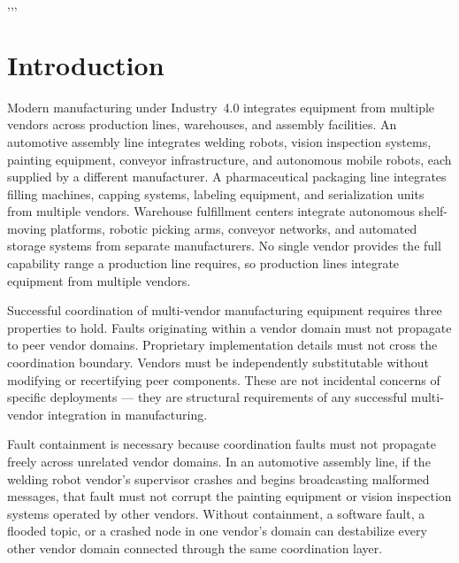 \documentclass[a4paper,fleqn]{cas-dc}
\begin{document}
\begin{highlights}
\item 
\item 
\item 
\end{highlights}



\begin{keywords}
 \sep \sep \sep
\end{keywords}

\maketitle

\section{Introduction} \label{sec:intro}

Modern manufacturing under Industry~4.0 integrates equipment from multiple vendors across production lines, warehouses, and assembly facilities. An automotive assembly line integrates welding robots, vision inspection systems, painting equipment, conveyor infrastructure, and autonomous mobile robots, each supplied by a different manufacturer. A pharmaceutical packaging line integrates filling machines, capping systems, labeling equipment, and serialization units from multiple vendors. Warehouse fulfillment centers integrate autonomous shelf-moving platforms, robotic picking arms, conveyor networks, and automated storage systems from separate manufacturers. No single vendor provides the full capability range a production line requires, so production lines integrate equipment from multiple vendors.

Successful coordination of multi-vendor manufacturing equipment requires three properties to hold. Faults originating within a vendor domain must not propagate to peer vendor domains. Proprietary implementation details must not cross the coordination boundary. Vendors must be independently substitutable without modifying or recertifying peer components. These are not incidental concerns of specific deployments — they are structural requirements of any successful multi-vendor integration in manufacturing.

Fault containment is necessary because coordination faults must not propagate freely across unrelated vendor domains. In an automotive assembly line, if the welding robot vendor's supervisor crashes and begins broadcasting malformed messages, that fault must not corrupt the painting equipment or vision inspection systems operated by other vendors. Without containment, a software fault, a flooded topic, or a crashed node in one vendor's domain can destabilize every other vendor domain connected through the same coordination layer.
\end{document}
